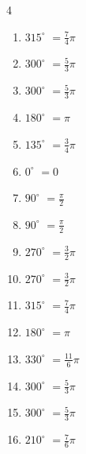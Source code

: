 \begin{multicols}{4}
\begin{enumerate}
  \item $\displaystyle 315^{\circ}$
        $\displaystyle =\frac{7}{4}\pi$

  \item $\displaystyle 300^{\circ}$
        $\displaystyle =\frac{5}{3}\pi$

  \item $\displaystyle 300^{\circ}$
        $\displaystyle =\frac{5}{3}\pi$

  \item $\displaystyle 180^{\circ}$
        $\displaystyle =\pi$

  \item $\displaystyle 135^{\circ}$
        $\displaystyle =\frac{3}{4}\pi$

  \item $\displaystyle 0^{\circ}$
        $\displaystyle =0$

  \item $\displaystyle 90^{\circ}$
        $\displaystyle =\frac{\pi}{2}$

  \item $\displaystyle 90^{\circ}$
        $\displaystyle =\frac{\pi}{2}$

  \item $\displaystyle 270^{\circ}$
        $\displaystyle =\frac{3}{2}\pi$

  \item $\displaystyle 270^{\circ}$
        $\displaystyle =\frac{3}{2}\pi$

  \item $\displaystyle 315^{\circ}$
        $\displaystyle =\frac{7}{4}\pi$

  \item $\displaystyle 180^{\circ}$
        $\displaystyle =\pi$

  \item $\displaystyle 330^{\circ}$
        $\displaystyle =\frac{11}{6}\pi$

  \item $\displaystyle 300^{\circ}$
        $\displaystyle =\frac{5}{3}\pi$

  \item $\displaystyle 300^{\circ}$
        $\displaystyle =\frac{5}{3}\pi$

  \item $\displaystyle 210^{\circ}$
        $\displaystyle =\frac{7}{6}\pi$

\end{enumerate}
\end{multicols}
